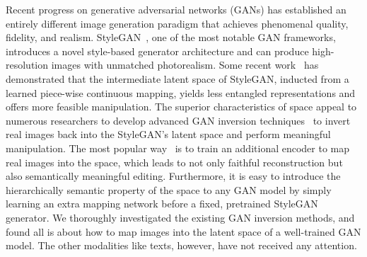 \documentclass[final]{cvpr}
\begin{document}
Recent progress on generative adversarial networks (GANs) has established an entirely different image generation paradigm that achieves phenomenal quality, fidelity, and realism.
StyleGAN~\cite{karras2019style}, one of the most notable GAN frameworks, introduces a novel style-based generator architecture and can produce high-resolution images with unmatched photorealism.
Some recent work~\cite{karras2019style} has demonstrated that the intermediate latent space  of StyleGAN, inducted from a learned piece-wise continuous mapping, yields less entangled representations and offers more feasible manipulation.
The superior characteristics of  space appeal to numerous researchers to develop advanced GAN inversion techniques~\cite{xia2021survey,bau2019inverting,abdal2019image2stylegan} to invert real images back into the StyleGAN's latent space and perform meaningful manipulation.
The most popular way~\cite{zhu2020indomain,richardson2020encoding} is to train an additional encoder to map real images into the  space, which leads to not only faithful reconstruction but also semantically meaningful editing. 
Furthermore, it is easy to introduce the hierarchically semantic property of the  space to any GAN model by simply learning an extra mapping network before a fixed, pretrained StyleGAN generator.
We thoroughly investigated the existing GAN inversion methods, and found all is about how to map images into the latent space of a well-trained GAN model.
The other modalities like texts, however, have not received any attention.
\end{document}
